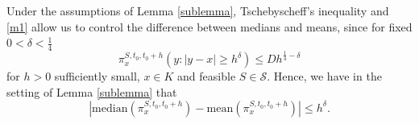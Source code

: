 \documentclass[11pt,a4paper]{article}%
\def\R{{\mathbb R}}
\numberwithin{equation}{section}
\begin{document}














Under the assumptions of Lemma \ref{sublemma}, Tschebyscheff's inequality and \eqref{m1} allow us to control the difference between medians and means, since for fixed $0<\delta<\frac{1}{4}$
\begin{equation*}
	\pi_x^{S,t_0,t_0 + h}\left( y \colon |y - x| \geq h^{\delta} \right) \leq  Dh^{\frac{1}{4} - \delta}
\end{equation*}
for $h > 0$ sufficiently small, $x \in K$ and feasible $S \in \mathcal S$. 
Hence, we have in the setting of Lemma \ref{sublemma} that
\begin{equation}\label{mean med control}
	\left\lvert\text{median}(\pi_x^{S,t_0,t_0 + h}) - \text{mean}(\pi_x^{S,t_0,t_0+h})\right\lvert \leq h^{\delta}.
\end{equation}
\end{document}

